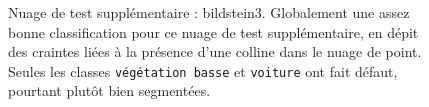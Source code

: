 \documentclass[a4paper, onecolumn, 11pt]{article}
\begin{document}
\begin{figure}[h]
    \centering
    \qquad
    \qquad
    \qquad
    \caption{Nuage de test supplémentaire : bildstein3. Globalement une assez bonne classification pour ce nuage de test supplémentaire, en dépit des craintes liées à la présence d'une colline dans le nuage de point. Seules les classes \texttt{végétation basse} et \texttt{voiture} ont fait défaut, pourtant plutôt bien segmentées.}
    \label{fig:bildstein3}
\end{figure}
\end{document}
